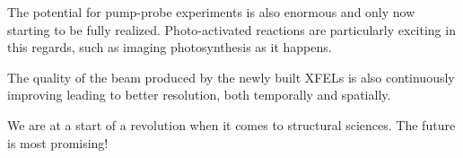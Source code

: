 The potential for pump-probe experiments is also enormous and only now starting to be
fully realized. Photo-activated reactions are particularly exciting in this
regards, such as imaging photosynthesis as it happens.

The quality of the beam produced by the newly built XFELs is also continuously
improving leading to better resolution, both temporally and spatially.

We are at a start of a revolution when it comes to structural sciences. 
The future is most promising!





